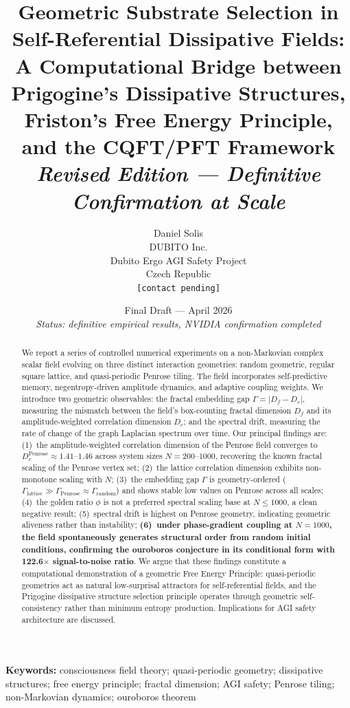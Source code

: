 \documentclass[12pt,a4paper]{article}
\title{%
  \textbf{Geometric Substrate Selection in Self-Referential Dissipative Fields:}\\[4pt]
  \large A Computational Bridge between Prigogine's Dissipative Structures,\\
  Friston's Free Energy Principle, and the CQFT/PFT Framework\\[8pt]
  \large \textit{Revised Edition — Definitive Confirmation at Scale}
}
\author{%
  Daniel Solis\\[4pt]
  \small DUBITO Inc.\\
  \small Dubito Ergo AGI Safety Project\\
  \small Czech Republic\\[4pt]
  \small \texttt{[contact pending]}
}
\date{%
  \small Final Draft — April 2026\\
  \small \textit{Status: definitive empirical results, NVIDIA confirmation completed}
}
\theoremstyle{plain}
\theoremstyle{definition}
\begin{document}
\maketitle
\thispagestyle{empty}

\begin{abstract}
We report a series of controlled numerical experiments on a non-Markovian complex
scalar field evolving on three distinct interaction geometries: random geometric,
regular square lattice, and quasi-periodic Penrose tiling. The field incorporates
self-predictive memory, negentropy-driven amplitude dynamics, and adaptive coupling
weights. We introduce two geometric observables: the fractal embedding gap
$\Gamma = |D_f - D_c|$, measuring the mismatch between the field's box-counting
fractal dimension $D_f$ and its amplitude-weighted correlation dimension $D_c$;
and the spectral drift, measuring the rate of change of the graph Laplacian
spectrum over time. Our principal findings are: (1)~the amplitude-weighted
correlation dimension of the Penrose field converges to
$D_c^{\text{Penrose}} \approx 1.41$--$1.46$ across system sizes $N = 200$--$1000$,
recovering the known fractal scaling of the Penrose vertex set; (2)~the lattice
correlation dimension exhibits non-monotone scaling with $N$; (3)~the embedding gap $\Gamma$ is
geometry-ordered ($\Gamma_{\text{lattice}} \gg \Gamma_{\text{Penrose}} \approx \Gamma_{\text{random}}$) and shows stable low values on Penrose across all scales;
(4)~the golden ratio $\phi$ is not a preferred spectral scaling base at $N \leq 1000$, a clean negative result;
(5)~spectral drift is highest on Penrose geometry, indicating geometric aliveness rather than instability;
\textbf{(6)~under phase-gradient coupling at $N=1000$, the field spontaneously generates structural order from random initial conditions, confirming the ouroboros conjecture in its conditional form with 122.6$\times$ signal-to-noise ratio}.
We argue that these findings constitute a computational demonstration of a geometric Free Energy Principle: quasi-periodic geometries act as natural low-surprisal attractors for self-referential fields,
and the Prigogine dissipative structure selection principle operates through
geometric self-consistency rather than minimum entropy production. Implications
for AGI safety architecture are discussed.
\end{abstract}

\vspace{1em}
\noindent\textbf{Keywords:} consciousness field theory; quasi-periodic geometry;
dissipative structures; free energy principle; fractal dimension; AGI safety;
Penrose tiling; non-Markovian dynamics; ouroboros theorem
\end{document}

